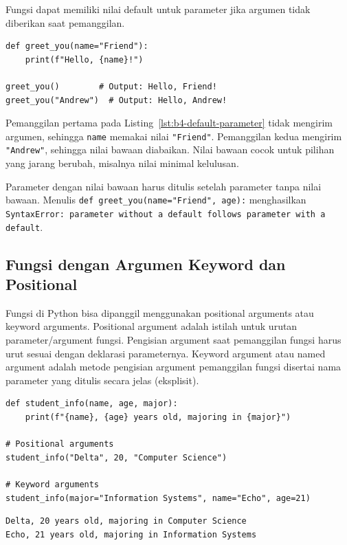 Fungsi dapat memiliki nilai default untuk parameter jika argumen tidak diberikan saat pemanggilan.

\begin{lstlisting}[style=PythonStyle, caption={Kode Python: function_with_default_parameter.py}, label={lst:b4-default-parameter}]
def greet_you(name="Friend"):
    print(f"Hello, {name}!")

greet_you()        # Output: Hello, Friend!
greet_you("Andrew")  # Output: Hello, Andrew!
\end{lstlisting}

Pemanggilan pertama pada Listing~\ref{lst:b4-default-parameter} tidak mengirim argumen, sehingga \texttt{name} memakai nilai \texttt{"Friend"}. Pemanggilan kedua mengirim \texttt{"Andrew"}, sehingga nilai bawaan diabaikan. Nilai bawaan cocok untuk pilihan yang jarang berubah, misalnya nilai minimal kelulusan.

Parameter dengan nilai bawaan harus ditulis setelah parameter tanpa nilai bawaan. Menulis \texttt{def greet_you(name="Friend", age):} menghasilkan \texttt{SyntaxError: parameter without a default follows parameter with a default}.

\subsection{Fungsi dengan Argumen Keyword dan Positional}
Fungsi di Python bisa dipanggil menggunakan positional arguments atau keyword arguments. Positional argument adalah istilah untuk urutan parameter/argument fungsi. Pengisian argument saat pemanggilan fungsi harus urut sesuai dengan deklarasi parameternya. Keyword argument atau named argument adalah metode pengisian argument pemanggilan fungsi disertai nama parameter yang ditulis secara jelas (eksplisit).

\begin{lstlisting}[style=PythonStyle, caption={Kode Python: function_with_keyword_and_positional.py}, label={lst:b4-keyword-positional}]
def student_info(name, age, major):
    print(f"{name}, {age} years old, majoring in {major}")

# Positional arguments
student_info("Delta", 20, "Computer Science")

# Keyword arguments
student_info(major="Information Systems", name="Echo", age=21)
\end{lstlisting}

\begin{lstlisting}[language=bash, caption={Keluaran function_with_keyword_and_positional.py}, label={lst:b4-keyword-positional-out}]
Delta, 20 years old, majoring in Computer Science
Echo, 21 years old, majoring in Information Systems
\end{lstlisting}


